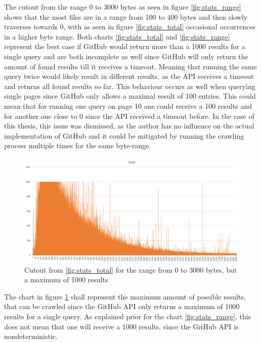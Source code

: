The cutout from the range 0 to 3000 bytes as seen in figure \ref{fig:stats_range} shows that the most files are in a range from 100 to 400 bytes and then slowly traverses towards 0, with as seen in figure \ref{fig:stats_total} occasional occurrences in a higher byte range. Both charts \ref{fig:stats_total} and \ref{fig:stats_range} represent the best case if GitHub would return more than a 1000 results for a single query and are both incomplete as well since GitHub will only return the amount of found results till it receives a timeout. Meaning that running the same query twice would likely result in different results, as the API receives a timeout and returns all found results so far. This behaviour occurs as well when querying single pages since GitHub only allows a maximal result of 100 entries. This could mean that for running one query on page 10 one could receive a 100 results and for another one close to 0 since the API received a timeout before. In the case of this thesis, this issue was dismissed, as the author has no influence on the actual implementation of GitHub and it could be mitigated by running the crawling process multiple times for the same byte-range.

\begin{figure}[H]
    \centering
    \includegraphics[scale=0.5]{graphics/stats_range_max_possible.png}
    \caption{Cutout from \ref{fig:stats_total} for the range from 0 to 3000 bytes, but a maximum of 1000 results }
    \label{fig:stats_max_possible}
\end{figure}

The chart in figure \ref{fig:stats_max_possible} shall represent the maximum amount of possible results, that can be crawled since the GitHub API only returns a maximum of 1000 results for a single query. As explained prior for the chart \ref{fig:stats_range}, this does not mean that one will receive a 1000 results, since the GitHub API is nondeterministic.

